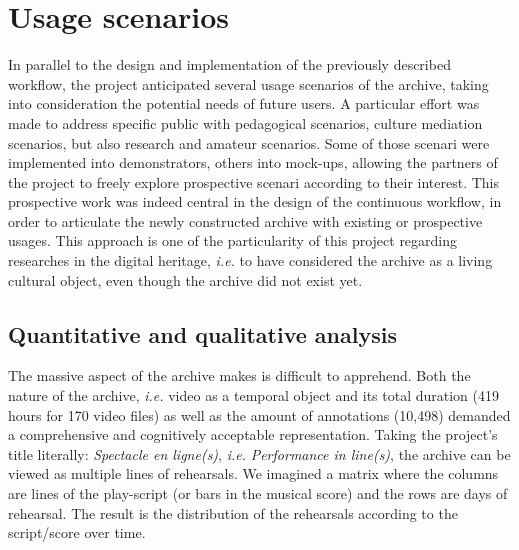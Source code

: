 \documentclass[conference]{IEEEtran}
\newcommand{\todo}[1]{\noindent\textcolor{red}{{\bf \{ToDo} #1{\bf \}}}}
\begin{document}
\section{Usage scenarios}
\label{sec:scenarios}
In parallel to the design and implementation of the previously described workflow, the project anticipated several usage scenarios of the archive, taking into consideration the potential needs of future users. A particular effort was made to address specific public with pedagogical scenarios, culture mediation scenarios, but also research and amateur scenarios. Some of those scenari were implemented into demonstrators, others into mock-ups, allowing the partners of the project to freely explore prospective scenari according to their interest. This prospective work was indeed central in the design of the continuous workflow, in order to articulate the newly constructed archive with existing or prospective usages. This approach is one of the particularity of this project regarding researches in the digital heritage, {\it i.e.} to have considered the archive as a living cultural object, even though the archive did not exist yet.

\subsection{Quantitative and qualitative analysis}
The massive aspect of the archive makes is difficult to apprehend. Both the nature of the archive, {\it i.e.} video as a temporal object\cite{stiegler98}  and its total duration (419 hours for 170 video files) as well as the amount of annotations (10,498) demanded a comprehensive and cognitively acceptable representation. Taking the project's title literally: \emph{Spectacle en ligne(s)}, {\it i.e.} \emph{Performance in line(s)}, the archive can be viewed as multiple lines of rehearsals. We imagined a matrix where the columns are lines of the play-script  (or bars in the musical score) and the rows are days of rehearsal. The result is the distribution of the rehearsals according to the script/score over time.

\end{document}
